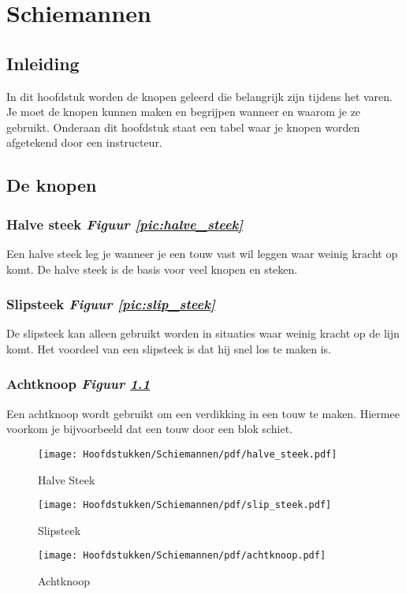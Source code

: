 \chapter{Schiemannen}
\section{Inleiding}
In dit hoofdstuk worden de knopen geleerd die belangrijk zijn tijdens het varen. Je moet de knopen kunnen maken en begrijpen wanneer en waarom je ze gebruikt. Onderaan dit hoofdstuk staat een tabel waar je knopen worden afgetekend door een instructeur. 
\section{De knopen}
\subsection{Halve steek \hfill \hspace{2 cm} \textit{Figuur \ref{pic:halve_steek}} } 
Een halve steek leg je wanneer je een touw vast wil leggen waar weinig kracht op komt. De halve steek is de basis voor veel knopen en steken.
\subsection{Slipsteek \hfill \textit{Figuur \ref{pic:slip_steek}}}
De slipsteek kan alleen gebruikt worden in situaties waar weinig kracht op de lijn komt. Het voordeel van een slipsteek is dat hij snel los te maken is.
\subsection{Achtknoop \hfill \textit{Figuur \ref{pic:achtknoop}}}
Een achtknoop wordt gebruikt om een verdikking in een touw te maken. Hiermee voorkom je bijvoorbeeld dat een touw door een blok schiet. 
\begin{figure}[h]
  \centering
  \begin{minipage}[b]{0.32\textwidth}
  \centering
    \texttt{[image: Hoofdstukken/Schiemannen/pdf/halve\_steek.pdf]}
    \caption{Halve Steek}
    \label{pic:halve_steek}
  \end{minipage}
  \hfill
  \begin{minipage}[b]{0.32\textwidth}
    \centering
    \texttt{[image: Hoofdstukken/Schiemannen/pdf/slip\_steek.pdf]}
    \caption{Slipsteek}
    \label{pic:slip_steek}
    \end{minipage}
  \hfill
  \begin{minipage}[b]{0.32\textwidth}
    \centering
    \texttt{[image: Hoofdstukken/Schiemannen/pdf/achtknoop.pdf]}
    \caption{Achtknoop}
    \label{pic:achtknoop}
  \end{minipage}
\end{figure}

